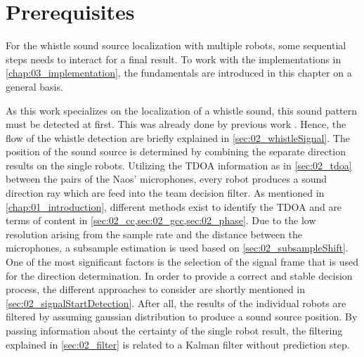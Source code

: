 \chapter{Prerequisites}
\label{chap:02_prerequisites}

For the whistle sound source localization with multiple robots, some
sequential steps needs to interact for a final result.
To work with the implementations in \cref{chap:03_implementation}, the fundamentals
are introduced in this chapter on a general basis.

As this work specializes on the localization of a whistle sound, this sound pattern
must be detected at first.
This was already done by previous work \cite{Hasselbring}.
Hence, the flow of the whistle detection are briefly explained in \cref{sec:02_whistleSignal}.
The position of the sound source is determined by combining the
separate direction results on the single robots.
Utilizing the \ac{TDOA} information as in \cref{sec:02_tdoa} between the pairs
of the Naos' microphones, every robot produces a sound direction ray which
are feed into the team decision filter.
As mentioned in \cref{chap:01_introduction}, different methods exist to identify the \ac{TDOA}
and are terms of content in \cref{sec:02_cc,sec:02_gcc,sec:02_phase}.
Due to the low resolution arising from the sample rate and the distance between the microphones,
a subsample estimation is used based on \cref{sec:02_subsampleShift}.
One of the most significant factors is the selection of the signal frame that is used for
the direction determination.
In order to provide a correct and stable decision process, the different approaches to
consider are shortly mentioned in \cref{sec:02_signalStartDetection}.
After all, the results of the individual robots are filtered by assuming
gaussian distribution to produce a sound source position.
By passing information about the certainty of the single robot result, the
filtering explained in \cref{sec:02_filter} is related to a Kalman filter without
prediction step.











